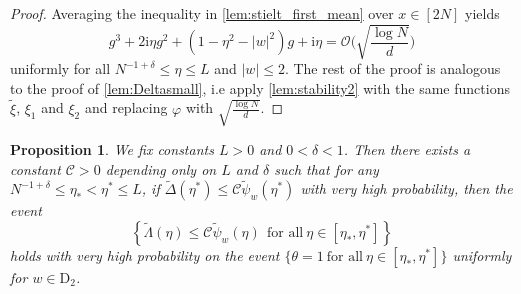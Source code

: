 \documentclass[11pt]{article}
\newcommand{\ii}{\mathrm{i}}
\newcommand{\abs}[1]{\left| #1 \right|}
\theoremstyle{plain}
\newtheorem{prop}{Proposition}[section]
\theoremstyle{remark}
\numberwithin{equation}{section}
\begin{document}
	\begin{proof}
		Averaging the inequality in \cref{lem:stielt_first_mean} over $x \in [2N]$ yields  
		\begin{equation*}
			g^3  + 2 \ii \eta g^2 +(1 - \eta^2 - \abs{w}^2)g+ \ii \eta  = \mathcal{O} \bigg(\sqrt{\frac{\log N}{d}}\bigg) 
		\end{equation*}
		uniformly for all $N^{-1+ \delta} \le \eta \le L$ and $\abs{w} \le 2$. The rest of the proof is analogous to the proof of \cref{lem:Deltasmall}, i.e apply \cref{lem:stability2} with the same functions $\widetilde{\xi}$, $\xi_1$ and $\xi_2$ and replacing $\varphi$ with $\sqrt{\frac{\log N}{d}}$.
	\end{proof}
	\begin{prop}\label{prop:phi_Lambda_small3new}
		We fix constants $L >0$ and $0 < \delta <1 $. Then there exists a constant $\mathcal{C} >0$ depending only on $L$ and $\delta$ such that for any $N^{-1+ \delta} \le \eta_{\ast} < \eta^{\ast} \le L$, if $\widetilde{\Delta}(\eta^*) \leq \mathcal C \widetilde{\psi}_w(\eta^*)$ with very high probability, then the event 
		\begin{equation*}
			\left\{  \widetilde{\Lambda}(\eta)\le \mathcal{C} \widetilde{\psi}_w(\eta)  ~~\text{for all}~ \eta \in [ \eta_{\ast}, \eta^{\ast}] \right\}
		\end{equation*}
		holds with very high probability on the event $\{ \theta =1 ~\text{for all} ~ \eta \in [\eta_{\ast}, \eta^{\ast}]\}$ 
		uniformly for $w \in \mathrm{D}_2$. 
	\end{prop}

	
\end{document}
